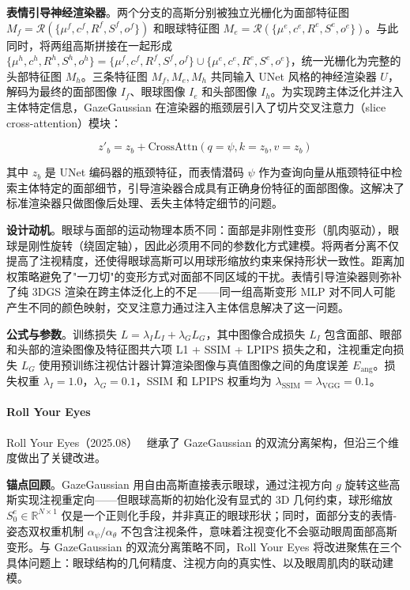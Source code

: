 \textbf{表情引导神经渲染器}。两个分支的高斯分别被独立光栅化为面部特征图 $M_f = \mathcal{R}(\{\mu^f, c^f, R^f, S^f, o^f\})$ 和眼球特征图 $M_e = \mathcal{R}(\{\mu^e, c^e, R^e, S^e, o^e\})$。与此同时，将两组高斯拼接在一起形成 $\{\mu^h, c^h, R^h, S^h, o^h\} = \{\mu^f, c^f, R^f, S^f, o^f\} \cup \{\mu^e, c^e, R^e, S^e, o^e\}$，统一光栅化为完整的头部特征图 $M_h$。三条特征图 $M_f, M_e, M_h$ 共同输入 UNet 风格的神经渲染器 $U$，解码为最终的面部图像 $I_f$、眼球图像 $I_e$ 和头部图像 $I_h$。为实现跨主体泛化并注入主体特定信息，GazeGaussian 在渲染器的瓶颈层引入了切片交叉注意力（slice cross-attention）模块：

\[
z'_b = z_b + \mathrm{CrossAttn}(q=\psi, k=z_b, v=z_b)
\]

其中 $z_b$ 是 UNet 编码器的瓶颈特征，而表情潜码 $\psi$ 作为查询向量从瓶颈特征中检索主体特定的面部细节，引导渲染器合成具有正确身份特征的面部图像。这解决了标准渲染器只做图像后处理、丢失主体特定细节的问题。

\textbf{设计动机}。眼球与面部的运动物理本质不同：面部是非刚性变形（肌肉驱动），眼球是刚性旋转（绕固定轴），因此必须用不同的参数化方式建模。将两者分离不仅提高了注视精度，还使得眼球高斯可以用球形缩放约束来保持形状一致性。距离加权策略避免了"一刀切"的变形方式对面部不同区域的干扰。表情引导渲染器则弥补了纯 3DGS 渲染在跨主体泛化上的不足——同一组高斯变形 MLP 对不同人可能产生不同的颜色映射，交叉注意力通过注入主体信息解决了这一问题。

\textbf{公式与参数}。训练损失 $L = \lambda_I L_I + \lambda_G L_G$，其中图像合成损失 $L_I$ 包含面部、眼部和头部的渲染图像及特征图共六项 L1 + SSIM + LPIPS 损失之和，注视重定向损失 $L_G$ 使用预训练注视估计器计算渲染图像与真值图像之间的角度误差 $E_{\text{ang}}$。损失权重 $\lambda_I = 1.0$，$\lambda_G = 0.1$，SSIM 和 LPIPS 权重均为 $\lambda_{\text{SSIM}} = \lambda_{\text{VGG}} = 0.1$。

\paragraph{Roll Your Eyes}

Roll Your Eyes（2025.08）~\cite{2508_06136} 继承了 GazeGaussian 的双流分离架构，但沿三个维度做出了关键改进。

\textbf{锚点回顾}。GazeGaussian 用自由高斯直接表示眼球，通过注视方向 $g$ 旋转这些高斯实现注视重定向——但眼球高斯的初始化没有显式的 3D 几何约束，球形缩放 $S_0^e \in \mathbb{R}^{N \times 1}$ 仅是一个正则化手段，并非真正的眼球形状；同时，面部分支的表情-姿态双权重机制 $\alpha_\psi / \alpha_\theta$ 不包含注视条件，意味着注视变化不会驱动眼周面部高斯变形。与 GazeGaussian 的双流分离策略不同，Roll Your Eyes 将改进聚焦在三个具体问题上：眼球结构的几何精度、注视方向的真实性、以及眼周肌肉的联动建模。

